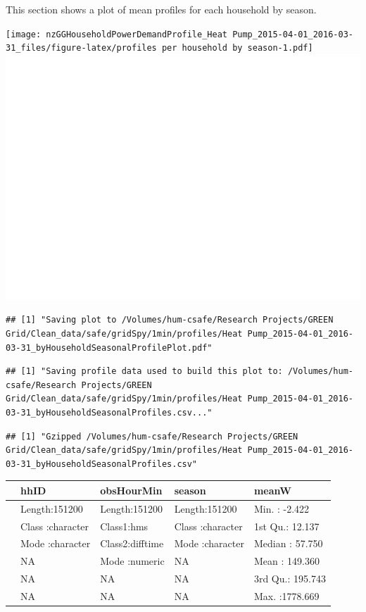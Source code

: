\documentclass[]{article}
\begin{document}
This section shows a plot of mean profiles for each household by season.

\texttt{[image: nzGGHouseholdPowerDemandProfile\_Heat Pump\_2015-04-01\_2016-03-31\_files/figure-latex/profiles per household by season-1.pdf]}
\includegraphics{nzGGHouseholdPowerDemandProfile_Heat Pump_2015-04-01_2016-03-31_files/figure-latex/profiles per household by season-2.pdf}

\begin{verbatim}
## [1] "Saving plot to /Volumes/hum-csafe/Research Projects/GREEN Grid/Clean_data/safe/gridSpy/1min/profiles/Heat Pump_2015-04-01_2016-03-31_byHouseholdSeasonalProfilePlot.pdf"
\end{verbatim}

\begin{verbatim}
## [1] "Saving profile data used to build this plot to: /Volumes/hum-csafe/Research Projects/GREEN Grid/Clean_data/safe/gridSpy/1min/profiles/Heat Pump_2015-04-01_2016-03-31_byHouseholdSeasonalProfiles.csv..."
\end{verbatim}

\begin{verbatim}
## [1] "Gzipped /Volumes/hum-csafe/Research Projects/GREEN Grid/Clean_data/safe/gridSpy/1min/profiles/Heat Pump_2015-04-01_2016-03-31_byHouseholdSeasonalProfiles.csv"
\end{verbatim}

\begin{longtable}[]{@{}lllll@{}}
\toprule
& hhID & obsHourMin & season & meanW\tabularnewline
\midrule
\endhead
& Length:151200 & Length:151200 & Length:151200 & Min. :
-2.422\tabularnewline
& Class :character & Class1:hms & Class :character & 1st Qu.:
12.137\tabularnewline
& Mode :character & Class2:difftime & Mode :character & Median :
57.750\tabularnewline
& NA & Mode :numeric & NA & Mean : 149.360\tabularnewline
& NA & NA & NA & 3rd Qu.: 195.743\tabularnewline
& NA & NA & NA & Max. :1778.669\tabularnewline
\bottomrule
\end{longtable}
\end{document}
